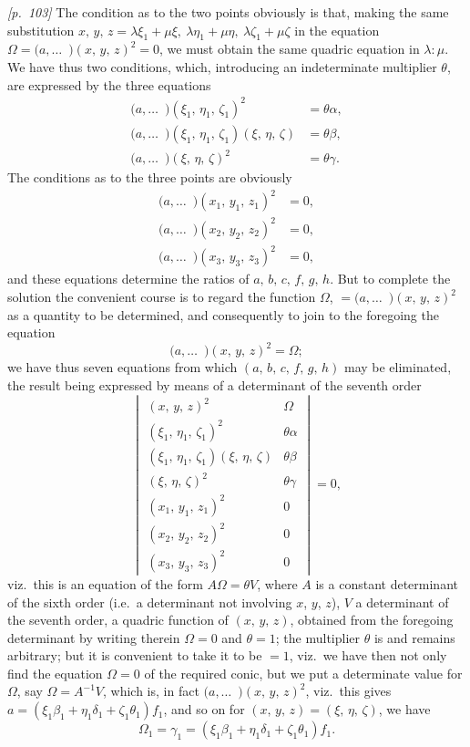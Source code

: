 \documentclass[11pt,a4paper]{article}
\theoremstyle{plain}
\theoremstyle{definition}
\theoremstyle{remark}
\begin{document}
\bigskip\noindent\textit{[p.~103]} The condition as to the two points obviously is that, making the same substitution $x,\,y,\,z = \lambda\xi_1 + \mu\xi,\ \lambda\eta_1 + \mu\eta,\ \lambda\zeta_1 + \mu\zeta$ in the equation $\Omega = (a,\ldots\!{\,\,\,)}(x,\,y,\,z)^2 = 0$, we must obtain the same quadric equation in $\lambda :\mu$. We have thus two conditions, which, introducing an indeterminate multiplier $\theta$, are expressed by the three equations
\begin{align*}
(a,\ldots\!{\,\,\,)}(\xi_1,\,\eta_1,\,\zeta_1)^2 &= \theta\alpha,\\
(a,\ldots\!{\,\,\,)}(\xi_1,\,\eta_1,\,\zeta_1)(\xi,\,\eta,\,\zeta) &= \theta\beta,\\
(a,\ldots\!{\,\,\,)}(\xi,\,\eta,\,\zeta)^2 &= \theta\gamma.
\end{align*}
The conditions as to the three points are obviously
\begin{align*}
(a,\ldots\!{\,\,\,)}(x_1,\,y_1,\,z_1)^2 &= 0,\\
(a,\ldots\!{\,\,\,)}(x_2,\,y_2,\,z_2)^2 &= 0,\\
(a,\ldots\!{\,\,\,)}(x_3,\,y_3,\,z_3)^2 &= 0,
\end{align*}
and these equations determine the ratios of $a,\,b,\,c,\,f,\,g,\,h$. But to complete the solution the convenient course is to regard the function $\Omega$, $= (a,\ldots\!{\,\,\,)}(x,\,y,\,z)^2$ as a quantity to be determined, and consequently to join to the foregoing the equation
\[
(a,\ldots\!{\,\,\,)}(x,\,y,\,z)^2 = \Omega;
\]
we have thus seven equations from which $(a,\,b,\,c,\,f,\,g,\,h)$ may be eliminated, the result being expressed by means of a determinant of the seventh order
\[
\begin{vmatrix}
(x,\,y,\,z)^2 & \Omega \\
(\xi_1,\,\eta_1,\,\zeta_1)^2 & \theta\alpha \\
(\xi_1,\,\eta_1,\,\zeta_1)(\xi,\,\eta,\,\zeta) & \theta\beta \\
(\xi,\,\eta,\,\zeta)^2 & \theta\gamma \\
(x_1,\,y_1,\,z_1)^2 & 0 \\
(x_2,\,y_2,\,z_2)^2 & 0 \\
(x_3,\,y_3,\,z_3)^2 & 0
\end{vmatrix} = 0,
\]
viz.\ this is an equation of the form $A\Omega = \theta V$, where $A$ is a constant determinant of the sixth order (i.e.\ a determinant not involving $x$, $y$, $z$), $V$ a determinant of the seventh order, a quadric function of $(x,\,y,\,z)$, obtained from the foregoing determinant by writing therein $\Omega = 0$ and $\theta = 1$; the multiplier $\theta$ is and remains arbitrary; but it is convenient to take it to be $= 1$, viz.\ we have then not only find the equation $\Omega = 0$ of the required conic, but we put a determinate value for $\Omega$, say $\Omega = A^{-1}V$, which is, in fact $(a,\ldots\!{\,\,\,)}(x,\,y,\,z)^2$, viz.\ this gives $a = (\xi_1\beta_1 + \eta_1\delta_1 + \zeta_1\theta_1)f_1$, and so on for $(x,\,y,\,z) = (\xi,\,\eta,\,\zeta)$, we have
\[
\Omega_1 = \gamma_1 = (\xi_1\beta_1 + \eta_1\delta_1 + \zeta_1\theta_1)f_1.
\]
\end{document}

